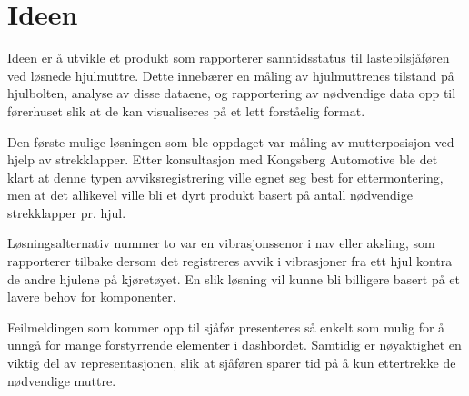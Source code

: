 \section{Ideen}
Ideen er å utvikle et produkt som rapporterer sanntidsstatus til lastebilsjåføren 
ved løsnede hjulmuttre. Dette innebærer en måling av hjulmuttrenes tilstand på 
hjulbolten, analyse av disse dataene, og rapportering av nødvendige data 
opp til førerhuset slik at de kan visualiseres på et lett forståelig format.

Den første mulige løsningen som ble oppdaget var måling av mutterposisjon ved 
hjelp av strekklapper. Etter konsultasjon med Kongsberg Automotive ble det klart 
at denne typen avviksregistrering ville egnet seg best for ettermontering, 
men at det allikevel ville bli et dyrt produkt basert på antall nødvendige 
strekklapper pr. hjul. 

Løsningsalternativ nummer to var en vibrasjonssenor i nav eller aksling, som 
rapporterer tilbake dersom det registreres avvik i vibrasjoner fra ett hjul 
kontra de andre hjulene på kjøretøyet. En slik løsning vil kunne bli billigere 
basert på et lavere behov for komponenter.

Feilmeldingen som kommer opp til sjåfør presenteres så enkelt som mulig for å unngå for mange forstyrrende elementer i dashbordet. Samtidig er nøyaktighet en viktig del av representasjonen, slik at sjåføren sparer tid på å kun ettertrekke de nødvendige muttre.